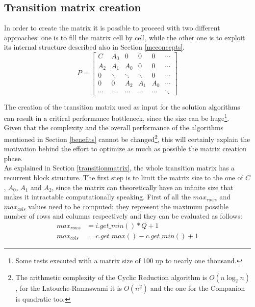 \subsection{Transition matrix creation} \label{matrixcreation}
In order to create the matrix it is possible to proceed with two different approaches: one is to fill the matrix cell by cell, while the other one is to exploit its internal structure described also in Section \ref{mcconcepts}.
\begin{equation*}
  P = 
  \begin{bmatrix}
    C & A_{0} & 0 & 0 & 0 & \cdots \\
    A_{2} & A_{1} & A_{0} & 0 & 0 & \cdots \\
    0 & \ddots & \ddots & \ddots & 0 & \cdots \\
    0 & 0 & A_{2} & A_{1} & A_{0} & \cdots \\
    \cdots & \cdots & \cdots & \cdots & \cdots & \ddots
  \end{bmatrix}
\end{equation*}

The creation of the transition matrix used as input for the solution algorithms can result in a critical performance bottleneck, since the size can be huge\footnote{Some tests executed with a matrix size of 100 up to nearly one thousand.}.\\ 
Given that the complexity and the overall performance of the algorithms mentioned in Section \ref{benefits} cannot be changed\footnote{The arithmetic complexity of the Cyclic Reduction algorithm is \( O(n\log_2n) \), for the Latouche-Ramaswami it is \( O(n^{2}) \) and the one for the Companion is quadratic too.}, this will certainly explain the motivation behind the effort to optimize as much as possible the matrix creation phase.\\
As explained in Section \ref{transitionmatrix}, the whole transition matrix has a recurrent block structure. The first step is to limit the matrix size to the one of \( C \), \( A_{0} \), \( A_{1} \) and \( A_{2} \), since the matrix can theoretically have an infinite size that makes it intractable computationally speaking. First of all the \( max_{rows} \) and \( max_{cols} \) values need to be computed: they represent the maximum possible number of rows and columns respectively and they can be evaluated as follows: 
\begin{equation*}
\begin{split}
  max_{rows} &= i.get\_min() * Q + 1 \\
  max_{cols} &= c.get\_max() - c.get\_min() + 1
\end{split}
\end{equation*}

